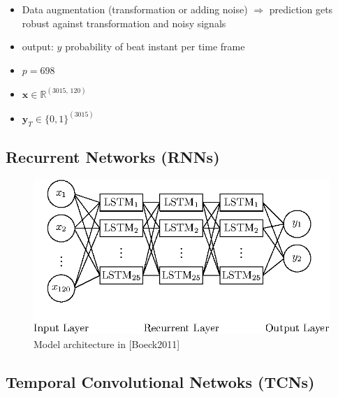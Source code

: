 \documentclass{article}
\begin{document}
\begin{itemize}
\item Data augmentation (transformation or adding noise) $\Rightarrow$ prediction gets robust against transformation and noisy signals
\item output: $y$ probability of beat instant per time frame 
\end{itemize}


\begin{itemize}
\item $p = 698$
\item $\mathbf x \in \mathbb R^{(3015, \,120)}$
\item $\mathbf y_T \in \{0,1\}^{(3015)}$
\end{itemize}

\subsection{Recurrent Networks (RNNs)}


\begin{figure}[htbp]
\centering
\includegraphics[scale=1.0]{figures/neural_network_boeck.eps}
\caption{Model architecture in \cite{Boeck2011}[Boeck2011]}
\label{fig:}
\end{figure}	

\subsection{Temporal Convolutional Netwoks (TCNs)}
\end{document}
